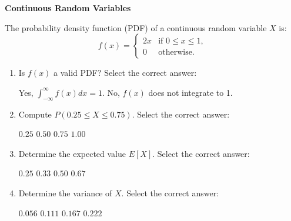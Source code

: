 \documentclass[12pt,letterpaper, onecolumn]{exam}
\begin{document}
\begin{questions}
\question[10 points]\textbf{Continuous Random Variables}\droppoints

The probability density function (PDF) of a continuous random variable \( X \) is:
\[
f(x) =
\begin{cases}
2x & \text{if } 0 \leq x \leq 1, \\
0 & \text{otherwise.}
\end{cases}
\]
\begin{enumerate}[label=(\alph*)]
    \item Is \( f(x) \) a valid PDF? Select the correct answer:
    \begin{choices}
        \choice Yes, \( \int_{-\infty}^\infty f(x) dx = 1 \).
        \choice No, \( f(x) \) does not integrate to 1.
    \end{choices}
    \item Compute \( P(0.25 \leq X \leq 0.75) \). Select the correct answer:
    \begin{choices}
        \choice \( 0.25 \)
        \choice \( 0.50 \)
        \choice \( 0.75 \)
        \choice \( 1.00 \)
    \end{choices}
    \item Determine the expected value \( E[X] \). Select the correct answer:
    \begin{choices}
        \choice \( 0.25 \)
        \choice \( 0.33 \)
        \choice \( 0.50 \)
        \choice \( 0.67 \)
    \end{choices}
        \item Determine the variance of $X$. Select the correct answer:
    \begin{choices}
        \choice \( 0.056 \)
        \choice \( 0.111 \)
        \choice \( 0.167 \)
        \choice \( 0.222 \)
    \end{choices}
\end{enumerate}

\begin{solution}
    \begin{parts}
        \part 
        \part 
        \part 
        \part 
    \end{parts}
\end{solution}



\end{questions}
\end{document}
